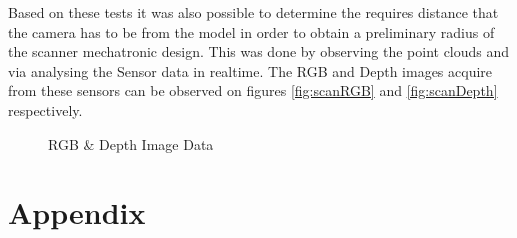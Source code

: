 \documentclass[12pt]{report}
\begin{document}
Based on these tests it was also possible to determine the requires distance that the camera has to be from the model in order to obtain a preliminary radius of the scanner mechatronic design.
This was done by observing the point clouds and via analysing the Sensor data in realtime. The RGB and Depth images acquire from these sensors can be observed on figures \ref{fig:scanRGB} and \ref{fig:scanDepth} respectively.
\begin{figure}[ht]
  \centering
  \hfill
 \label{fig::RGBD d435i}
 \caption{RGB \& Depth Image Data}
\end{figure}


\nocite{*}   %



\appendix
\chapter{\vspace{-5.5cm}Appendix}
\end{document}
